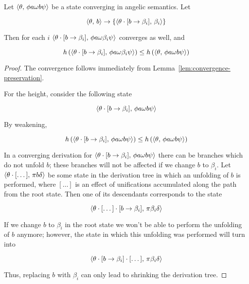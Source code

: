 
\begin{lemma}
  \label{lem:height-mono}
  Let $\langle \theta,\,\phi a \omega b \psi \rangle$ be a state converging in angelic semantics. Let
  
  \[
  \langle \theta,\,b \rangle\to\{\langle \theta\cdot[b\to\beta_i],\,\beta_i \rangle\}
  \]

  Then for each $i$ $\langle \theta\cdot[b\to\beta_i],\,\phi a \omega \beta_i \psi \rangle$ converges as well,
  and

  \[
  h\,(\langle \theta\cdot[b\to\beta_i],\,\phi a \omega \beta_i \psi \rangle)\le h\,(\langle \theta,\,\phi a \omega b \psi \rangle)
  \]  
\end{lemma}
\begin{proof}
  The convergence follows immediately from Lemma~\ref{lem:convergence-preservation}.
  
  For the height, consider the following state

  \[
   \langle \theta\cdot[b\to\beta_i],\,\phi a \omega b \psi \rangle
  \]

  By weakening,

  \[
  h\,(\langle \theta\cdot[b\to\beta_i],\,\phi a \omega b \psi \rangle)\le h\,( \langle \theta,\,\phi a \omega b \psi \rangle)
  \]

  In a converging derivation for $\langle \theta\cdot[b\to\beta_i],\,\phi a \omega b \psi \rangle$ there can be branches which do not unfold $b$; these
  branches will not be affected if we change $b$ to $\beta_i$. Let $\langle \theta\cdot[\dots],\,\pi b \delta \rangle$ be some state in the derivation
  tree in which an unfolding of $b$ is performed, where $[\dots]$ is an effect of unifications accumulated along the path from the root state.
  Then one of its descendants corresponds to the state

  \[
  \langle \theta\cdot[\dots]\cdot[b\to\beta_i],\,\pi\beta_i\delta \rangle
  \]
  
  If we change $b$ to $\beta_i$ in the root state we won't be able to perform the unfolding of $b$ anymore; however, the state in which this
  unfolding was performed will turn into

  \[
  \langle \theta\cdot[b\to\beta_i]\cdot[\dots],\,\pi\beta_i\delta \rangle
  \]

  Thus, replacing $b$ with $\beta_i$ can only lead to shrinking the derivation tree.
\end{proof}

